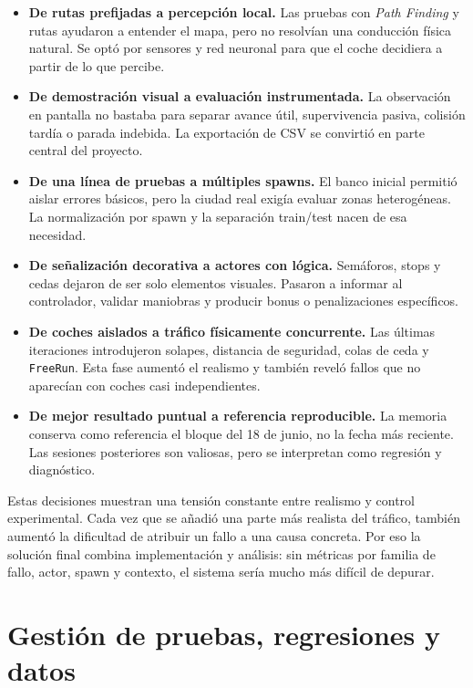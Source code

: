 \begin{itemize}
  \item \textbf{De rutas prefijadas a percepción local.} Las pruebas con \textit{Path Finding} y rutas ayudaron a entender el mapa, pero no resolvían una conducción física natural. Se optó por sensores y red neuronal para que el coche decidiera a partir de lo que percibe.
  \item \textbf{De demostración visual a evaluación instrumentada.} La observación en pantalla no bastaba para separar avance útil, supervivencia pasiva, colisión tardía o parada indebida. La exportación de CSV se convirtió en parte central del proyecto.
  \item \textbf{De una línea de pruebas a múltiples spawns.} El banco inicial permitió aislar errores básicos, pero la ciudad real exigía evaluar zonas heterogéneas. La normalización por spawn y la separación train/test nacen de esa necesidad.
  \item \textbf{De señalización decorativa a actores con lógica.} Semáforos, stops y cedas dejaron de ser solo elementos visuales. Pasaron a informar al controlador, validar maniobras y producir bonus o penalizaciones específicos.
  \item \textbf{De coches aislados a tráfico físicamente concurrente.} Las últimas iteraciones introdujeron solapes, distancia de seguridad, colas de ceda y \texttt{FreeRun}. Esta fase aumentó el realismo y también reveló fallos que no aparecían con coches casi independientes.
  \item \textbf{De mejor resultado puntual a referencia reproducible.} La memoria conserva como referencia el bloque del 18 de junio, no la fecha más reciente. Las sesiones posteriores son valiosas, pero se interpretan como regresión y diagnóstico.
\end{itemize}

Estas decisiones muestran una tensión constante entre realismo y control experimental. Cada vez que se añadió una parte más realista del tráfico, también aumentó la dificultad de atribuir un fallo a una causa concreta. Por eso la solución final combina implementación y análisis: sin métricas por familia de fallo, actor, spawn y contexto, el sistema sería mucho más difícil de depurar.

\section{Gestión de pruebas, regresiones y datos}

